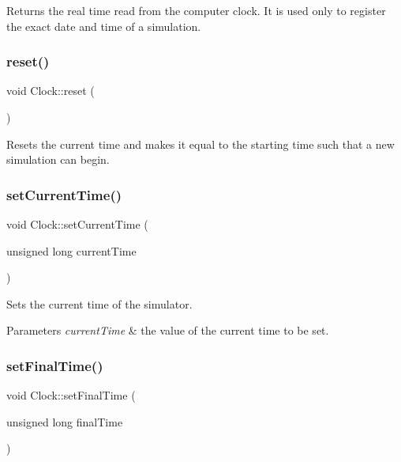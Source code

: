 \begin{DoxyReturn}{Returns}
the real time read from the computer clock. It is used only to register the exact date and time of a simulation. 
\end{DoxyReturn}
\mbox{\label{class_clock_a0ab5423b0a997aa13d7b6131c46d1358}} 
\subsubsection{\texorpdfstring{reset()}{reset()}}
{\footnotesize\ttfamily void Clock\+::reset (\begin{DoxyParamCaption}{ }\end{DoxyParamCaption})}

Resets the current time and makes it equal to the starting time such that a new simulation can begin. \mbox{\label{class_clock_a7046e8733ab749d3c24b3c61bd108d6c}} 
\subsubsection{\texorpdfstring{setCurrentTime()}{setCurrentTime()}}
{\footnotesize\ttfamily void Clock\+::set\+Current\+Time (\begin{DoxyParamCaption}\item[{unsigned long}]{current\+Time }\end{DoxyParamCaption})}

Sets the current time of the simulator. 
\begin{DoxyParams}{Parameters}
{\em current\+Time} & the value of the current time to be set. \\
\hline
\end{DoxyParams}
\mbox{\label{class_clock_a4780f83b55bc2539cd7069cfc4f06d99}} 
\subsubsection{\texorpdfstring{setFinalTime()}{setFinalTime()}}
{\footnotesize\ttfamily void Clock\+::set\+Final\+Time (\begin{DoxyParamCaption}\item[{unsigned long}]{final\+Time }\end{DoxyParamCaption})}

